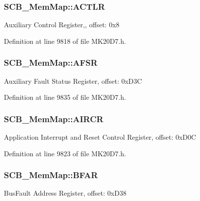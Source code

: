 \subsubsection[{\texorpdfstring{A\+C\+T\+LR}{ACTLR}}]{ S\+C\+B\+\_\+\+Mem\+Map\+::\+A\+C\+T\+LR}\hypertarget{struct_s_c_b___mem_map_a474a33074611146734690e48ed41282e}{}\label{struct_s_c_b___mem_map_a474a33074611146734690e48ed41282e}
Auxiliary Control Register,, offset\+: 0x8 

Definition at line 9818 of file M\+K20\+D7.\+h.

\subsubsection[{\texorpdfstring{A\+F\+SR}{AFSR}}]{ S\+C\+B\+\_\+\+Mem\+Map\+::\+A\+F\+SR}\hypertarget{struct_s_c_b___mem_map_aa02bdd6294d9240a566fe92085f62ae1}{}\label{struct_s_c_b___mem_map_aa02bdd6294d9240a566fe92085f62ae1}
Auxiliary Fault Status Register, offset\+: 0x\+D3C 

Definition at line 9835 of file M\+K20\+D7.\+h.

\subsubsection[{\texorpdfstring{A\+I\+R\+CR}{AIRCR}}]{ S\+C\+B\+\_\+\+Mem\+Map\+::\+A\+I\+R\+CR}\hypertarget{struct_s_c_b___mem_map_a3f874ca1c6e17ae4beadac22e8ec17ec}{}\label{struct_s_c_b___mem_map_a3f874ca1c6e17ae4beadac22e8ec17ec}
Application Interrupt and Reset Control Register, offset\+: 0x\+D0C 

Definition at line 9823 of file M\+K20\+D7.\+h.

\subsubsection[{\texorpdfstring{B\+F\+AR}{BFAR}}]{ S\+C\+B\+\_\+\+Mem\+Map\+::\+B\+F\+AR}\hypertarget{struct_s_c_b___mem_map_a57e3932788931280ee70b7389c4b23f4}{}\label{struct_s_c_b___mem_map_a57e3932788931280ee70b7389c4b23f4}
Bus\+Fault Address Register, offset\+: 0x\+D38 

